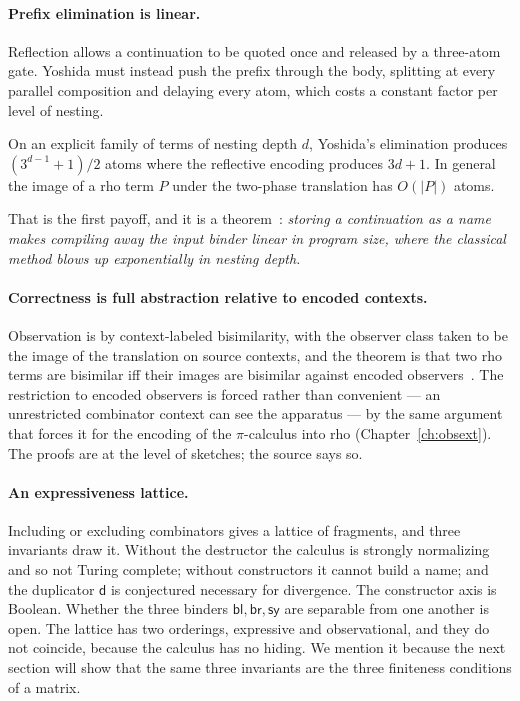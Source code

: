 \paragraph{Prefix elimination is linear.} Reflection allows a continuation to be quoted
once and released by a three-atom gate. Yoshida must instead push the prefix through the
body, splitting at every parallel composition and delaying every atom, which costs a
constant factor per level of nesting.

\begin{proposition}[Succinctness]
\label{cb:prop:blowup}
On an explicit family of terms of nesting depth $d$, Yoshida's elimination produces
$(3^{d-1}+1)/2$ atoms where the reflective encoding produces $3d+1$. In general the image
of a rho term $P$ under the two-phase translation has $O(|P|)$ atoms.
\end{proposition}

That is the first payoff, and it is a theorem~\cite[Prop.~8.1]{rhocomb3}: \emph{storing a
continuation as a name makes compiling away the input binder linear in program size, where
the classical method blows up exponentially in nesting depth.}

\paragraph{Correctness is full abstraction relative to encoded contexts.} Observation is by
context-labeled bisimilarity, with the observer class taken to be the image of the
translation on source contexts, and the theorem is that two rho terms are bisimilar iff
their images are bisimilar against encoded observers~\cite[\S7]{rhocomb3}. The
restriction to encoded observers is forced rather than convenient --- an unrestricted
combinator context can see the apparatus --- by the same argument that forces it for the
encoding of the $\pi$-calculus into rho (Chapter~\ref{ch:obsext}). The proofs are at the
level of sketches; the source says so.

\paragraph{An expressiveness lattice.} Including or excluding combinators gives a lattice
of fragments, and three invariants draw it. Without the destructor the calculus is
strongly normalizing and so not Turing complete; without constructors it cannot build a
name; and the duplicator $\mathsf{d}$ is conjectured necessary for divergence. The
constructor axis is Boolean. Whether the three binders $\mathsf{bl},\mathsf{br},\mathsf{sy}$
are separable from one another is open. The lattice has two orderings, expressive and
observational, and they do not coincide, because the calculus has no hiding. We mention it
because the next section will show that the same three invariants are the three finiteness
conditions of a matrix.

